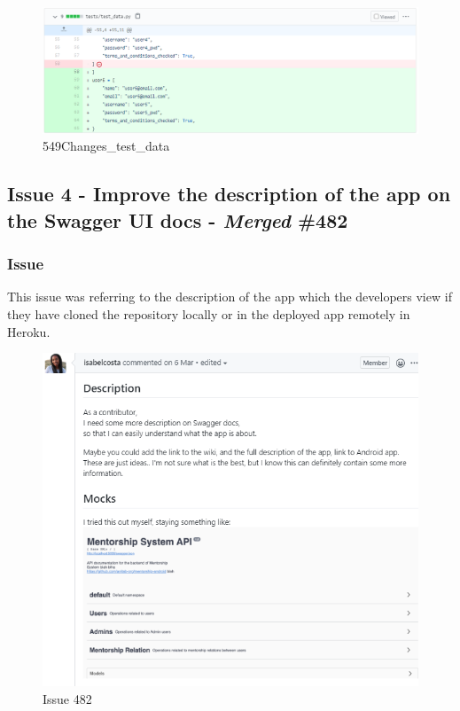 \documentclass{article}
\begin{document}
\begin{figure}[tph!]
\centerline{\includegraphics[totalheight=15cm, width=16cm]{549Changes_test_data.png}}
    \caption{549Changes\_test\_data}
    \label{fig:verticalcell}
\end{figure}
\vfill
\clearpage

\subsection{Issue 4 - Improve the description of the app on the Swagger UI docs - \emph{Merged} \#482}
\subsubsection{Issue}
\hspace{0.5cm}This issue was referring to the description of the app which the developers view if they have cloned the repository locally or in the deployed app remotely in Heroku.
\begin{figure}[tph!]
\centerline{\includegraphics[totalheight=12cm, width=14cm]{issue482.png}}
    \caption{Issue 482}
    \label{fig:verticalcell}
\end{figure}
\end{document}
